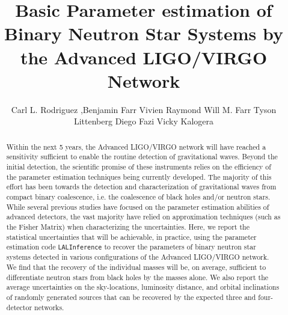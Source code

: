 \documentclass[11pt,a4paper]{emulateapj}
\begin{document}
\title{Basic Parameter estimation of Binary Neutron Star Systems by the Advanced LIGO/VIRGO Network}
\author{Carl L. Rodriguez 
,Benjamin Farr 
Vivien Raymond 
Will M. Farr 
Tyson Littenberg
Diego Fazi
Vicky Kalogera}




\begin{abstract}

Within the next 5 years, the Advanced LIGO/VIRGO network will have reached a sensitivity sufficient to enable the routine detection of gravitational waves.  Beyond the initial detection, the scientific promise of these instruments relies on the efficiency of the parameter estimation techniques being currently developed.  The majority of this effort has been towards the detection and characterization of gravitational waves from compact binary coalescence, i.e. the coalescence of black holes and/or neutron stars.  While several previous studies have focused on the parameter estimation abilities of advanced detectors, the vast majority have relied on approximation techniques (such as the Fisher Matrix) when characterizing the uncertainties.  Here, we report the statistical uncertainties that will be achievable, in practice, using the parameter estimation code \texttt{LALInference} to recover the parameters of binary neutron star systems detected in various configurations of the Advanced LIGO/VIRGO network.  We find that the recovery of the individual masses will be, on average, sufficient to differentiate neutron stars from black holes by the masses alone.  We also report the average uncertainties on the sky-locations, luminosity distance, and orbital inclinations of randomly generated sources that can be recovered by the expected three and four-detector networks.
\end{abstract}

\maketitle
\end{document}
